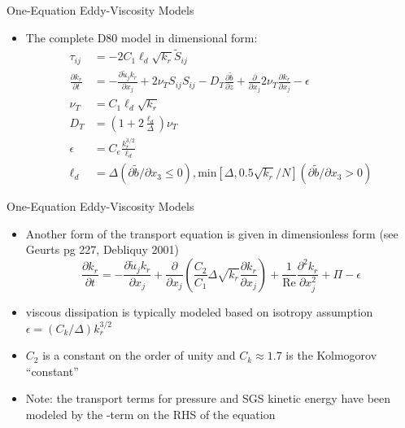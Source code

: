 \begin{frame}{One-Equation Eddy-Viscosity Models}
\begin{itemize}
	\item The complete D80 model in dimensional form:
	\begin{align*}
	\tau_{ij} &= -2 C_1\ell_d\sqrt{k_r}\widetilde{S}_{ij}\\
	\frac{\partial k_r}{\partial t} &= - \frac{\partial \tilde{u}_j k_r}{\partial x_j} + 2 \nu_T S_{ij}S_{ij} - D_T \frac{\partial \tilde{b}}{\partial z} \nonumber + \frac{\partial}{\partial x_j}2 \nu_T \frac{\partial k_r}{\partial x_j} - \epsilon\\
	\nu_T &= C_1\ell_d\sqrt{k_r}	\\
		D_T &= \left( 1 + 2\frac{\ell_d}{\Delta} \right)\nu_T \\
		\epsilon &= C_e \frac{k_r^{3/2}}{\ell_d}\\
		\ell_d &= \Delta (\partial \tilde{b}/\partial x_3 \leq 0), \mathrm{min}\left[\Delta,0.5\sqrt{k_r}/N\right] (\partial \tilde{b}/\partial x_3 > 0)
	\end{align*}

\end{itemize}

\end{frame}


\begin{frame}{One-Equation Eddy-Viscosity Models}
\begin{itemize}
	\item Another form of the transport equation is given in dimensionless form (see Geurts pg 227, Debliquy 2001)
	$$\frac{\partial k_r}{\partial t} = - \frac{\partial \tilde u_j k_r}{\partial x_j} + \frac{\partial}{\partial x_j}\left(\frac{C_2}{C_1} \Delta \sqrt{k_r}\frac{\partial k_r}{\partial x_j}\right) + \frac{1}{\text{Re}}\frac{\partial^2 k_r}{\partial x_j^2} + \Pi - \epsilon$$
	\item viscous dissipation is typically modeled based on isotropy assumption $\epsilon = (C_k/\Delta)k_r^{3/2}$
	\item $C_2$ is a constant on the order of unity and $C_k\approx1.7$ is the Kolmogorov ``constant''
	\item Note: the transport terms for pressure and SGS kinetic energy have been modeled by the -term on the RHS of the equation
\end{itemize}

\end{frame}

